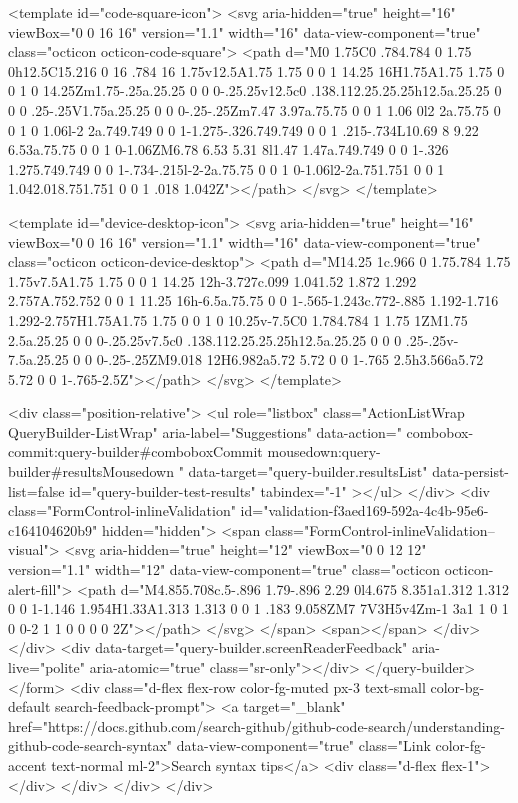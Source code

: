 <template id="code-square-icon">
  <svg aria-hidden="true" height="16" viewBox="0 0 16 16" version="1.1" width="16" data-view-component="true" class="octicon octicon-code-square">
    <path d="M0 1.75C0 .784.784 0 1.75 0h12.5C15.216 0 16 .784 16 1.75v12.5A1.75 1.75 0 0 1 14.25 16H1.75A1.75 1.75 0 0 1 0 14.25Zm1.75-.25a.25.25 0 0 0-.25.25v12.5c0 .138.112.25.25.25h12.5a.25.25 0 0 0 .25-.25V1.75a.25.25 0 0 0-.25-.25Zm7.47 3.97a.75.75 0 0 1 1.06 0l2 2a.75.75 0 0 1 0 1.06l-2 2a.749.749 0 0 1-1.275-.326.749.749 0 0 1 .215-.734L10.69 8 9.22 6.53a.75.75 0 0 1 0-1.06ZM6.78 6.53 5.31 8l1.47 1.47a.749.749 0 0 1-.326 1.275.749.749 0 0 1-.734-.215l-2-2a.75.75 0 0 1 0-1.06l2-2a.751.751 0 0 1 1.042.018.751.751 0 0 1 .018 1.042Z"></path>
</svg>
</template>

<template id="device-desktop-icon">
  <svg aria-hidden="true" height="16" viewBox="0 0 16 16" version="1.1" width="16" data-view-component="true" class="octicon octicon-device-desktop">
    <path d="M14.25 1c.966 0 1.75.784 1.75 1.75v7.5A1.75 1.75 0 0 1 14.25 12h-3.727c.099 1.041.52 1.872 1.292 2.757A.752.752 0 0 1 11.25 16h-6.5a.75.75 0 0 1-.565-1.243c.772-.885 1.192-1.716 1.292-2.757H1.75A1.75 1.75 0 0 1 0 10.25v-7.5C0 1.784.784 1 1.75 1ZM1.75 2.5a.25.25 0 0 0-.25.25v7.5c0 .138.112.25.25.25h12.5a.25.25 0 0 0 .25-.25v-7.5a.25.25 0 0 0-.25-.25ZM9.018 12H6.982a5.72 5.72 0 0 1-.765 2.5h3.566a5.72 5.72 0 0 1-.765-2.5Z"></path>
</svg>
</template>

        <div class="position-relative">
                <ul
                  role="listbox"
                  class="ActionListWrap QueryBuilder-ListWrap"
                  aria-label="Suggestions"
                  data-action="
                    combobox-commit:query-builder#comboboxCommit
                    mousedown:query-builder#resultsMousedown
                  "
                  data-target="query-builder.resultsList"
                  data-persist-list=false
                  id="query-builder-test-results"
                  tabindex="-1"
                ></ul>
        </div>
      <div class="FormControl-inlineValidation" id="validation-f3aed169-592a-4c4b-95e6-c164104620b9" hidden="hidden">
        <span class="FormControl-inlineValidation--visual">
          <svg aria-hidden="true" height="12" viewBox="0 0 12 12" version="1.1" width="12" data-view-component="true" class="octicon octicon-alert-fill">
    <path d="M4.855.708c.5-.896 1.79-.896 2.29 0l4.675 8.351a1.312 1.312 0 0 1-1.146 1.954H1.33A1.313 1.313 0 0 1 .183 9.058ZM7 7V3H5v4Zm-1 3a1 1 0 1 0 0-2 1 1 0 0 0 0 2Z"></path>
</svg>
        </span>
        <span></span>
</div>    </div>
    <div data-target="query-builder.screenReaderFeedback" aria-live="polite" aria-atomic="true" class="sr-only"></div>
</query-builder></form>
          <div class="d-flex flex-row color-fg-muted px-3 text-small color-bg-default search-feedback-prompt">
            <a target="_blank" href="https://docs.github.com/search-github/github-code-search/understanding-github-code-search-syntax" data-view-component="true" class="Link color-fg-accent text-normal ml-2">Search syntax tips</a>            <div class="d-flex flex-1"></div>
          </div>
        </div>
</div>

